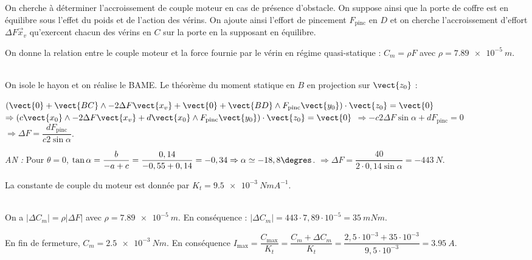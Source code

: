 On cherche à déterminer l’accroissement de couple moteur en cas de présence d’obstacle. On suppose ainsi que la
porte de coffre est en équilibre sous l’effet du poids et de l’action des vérins. On ajoute ainsi l’effort de pincement
$ F_{\text{pinc}}$ en $D$ et on cherche l’accroissement d’effort $\Delta F\vec{x}_v$ qu’exercent chacun des vérins en $C$ sur la porte en la supposant en équilibre.

On donne la relation entre le couple moteur et la force fournie par le vérin en régime quasi-statique : $C_m=\rho F$ avec $\rho=\SI{7,89e-5}{m}$.

\fi


\ifprof
\begin{corrige}~\\
On isole le hayon et on réalise le BAME. Le théorème du moment statique en $B$ en projection sur $\vect{z_0}$ : 

$ \left( 
\vect{0} + \vect{BC}\wedge -2\Delta F \vect{x_v}
+ \vect{0} + \vect{BD}\wedge F_{\text{pinc}}\vect{y_0}
\right) \cdot \vect {z_0} = \vect{0} $
$\Rightarrow \left( 
c\vect{x_0}\wedge -2\Delta F \vect{x_v}
+ d\vect{x_0}\wedge F_{\text{pinc}}\vect{y_0}
\right) \cdot \vect {z_0} = \vect{0}$
$\Rightarrow  
-c 2\Delta F  \sin \alpha + dF_{\text{pinc}}  = {0} $
$\Rightarrow  
\Delta F  = \dfrac{dF_{\text{pinc}}}{c 2  \sin \alpha}  $. 

\textit{AN :}
Pour $\theta=0$, $ \tan \alpha = \dfrac{b}{-a+c}=\dfrac{0,14}{-0,55+0,14}=-0,34 \Rightarrow \alpha \simeq -18,8 \degres$.
$\Rightarrow  
\Delta F  = \dfrac{40}{2\cdot 0,14  \sin \alpha} = \SI{-443}{N} $.
\end{corrige}
\else

\fi

La constante de couple du moteur est donnée par $K_t = \SI{9,5e-3}{NmA^{-1}}$.

\ifprof
\begin{corrige}~\\
On a $\left|\Delta C_m\right|=\rho \left|\Delta F \right|$ avec $\rho=\SI{7,89e-5}{m}$. En conséquence : $\left|\Delta C_m\right|=443 \cdot 7,89 \cdot 10^{-5} = \SI{35}{mNm}$.

En fin de fermeture, $C_m=\SI{2,5e-3}{Nm}$.
En conséquence $I_{\text{max}}=\dfrac{C_{\text{max}}}{K_t}=\dfrac{C_{m}+\Delta C_m}{K_t}=\dfrac{2,5\cdot 10^{-3}+35\cdot 10^{-3}}{9,5\cdot 10^{-3}}=\SI{3,95}{A}$.

\end{corrige}
\else
\fi


